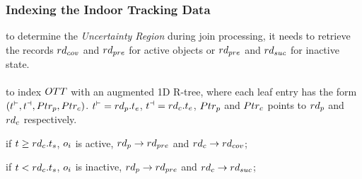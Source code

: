 
\begin{frame}
\frametitle{Indexing the Indoor Tracking Data}

\textrm{to determine the \emph{Uncertainty Region} during join processing, it needs to retrieve the records $\mathnormal{rd_{cov}}$ and $\mathnormal{rd_{pre}}$ for active objects or $\mathnormal{rd_{pre}}$ and $\mathnormal{rd_{suc}}$ for inactive state.}
\\~\\
to index $\mathnormal{OTT}$ with an augmented 1D R-tree, where each leaf entry has the form $\mathnormal{(t^{\vdash},t^{\dashv},Ptr_{p},Ptr_{c})}$. $\mathnormal{t^{\vdash} = rd_p.t_e}$, $\mathnormal{t^{\dashv} = rd_c.t_e}$, $\mathnormal{Ptr_p}$ and $\mathnormal{Ptr_c}$ points to $\mathnormal{rd_p}$ and $\mathnormal{rd_c}$ respectively.

\begin{fitemize}
  \item if $\mathnormal{t \geq rd_c.t_s}$, $\mathnormal{o_i}$ is active, $\mathnormal{rd_p \rightarrow rd_{pre}}$ and $\mathnormal{rd_c \rightarrow rd_{cov}}$;
  \item if $\mathnormal{t < rd_c.t_s}$, $\mathnormal{o_i}$ is inactive, $\mathnormal{rd_p \rightarrow rd_{pre}}$ and $\mathnormal{rd_c \rightarrow rd_{suc}}$;
\end{fitemize}

\end{frame}


